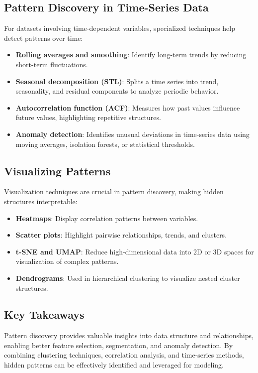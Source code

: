 \documentclass[12pt,openany]{book}
\begin{document}
\subsection{Pattern Discovery in Time-Series Data}

For datasets involving time-dependent variables, specialized techniques help detect patterns over time:
\begin{itemize}
    \item \textbf{Rolling averages and smoothing}: Identify long-term trends by reducing short-term fluctuations.
    \item \textbf{Seasonal decomposition (STL)}: Splits a time series into trend, seasonality, and residual components to analyze periodic behavior.
    \item \textbf{Autocorrelation function (ACF)}: Measures how past values influence future values, highlighting repetitive structures.
    \item \textbf{Anomaly detection}: Identifies unusual deviations in time-series data using moving averages, isolation forests, or statistical thresholds.
\end{itemize}

\subsection{Visualizing Patterns}

Visualization techniques are crucial in pattern discovery, making hidden structures interpretable:
\begin{itemize}
    \item \textbf{Heatmaps}: Display correlation patterns between variables.
    \item \textbf{Scatter plots}: Highlight pairwise relationships, trends, and clusters.
    \item \textbf{t-SNE and UMAP}: Reduce high-dimensional data into 2D or 3D spaces for visualization of complex patterns.
    \item \textbf{Dendrograms}: Used in hierarchical clustering to visualize nested cluster structures.
\end{itemize}

\subsection{Key Takeaways}

Pattern discovery provides valuable insights into data structure and relationships, enabling better feature selection, segmentation, and anomaly detection. By combining clustering techniques, correlation analysis, and time-series methods, hidden patterns can be effectively identified and leveraged for modeling.
\newline
\end{document}
